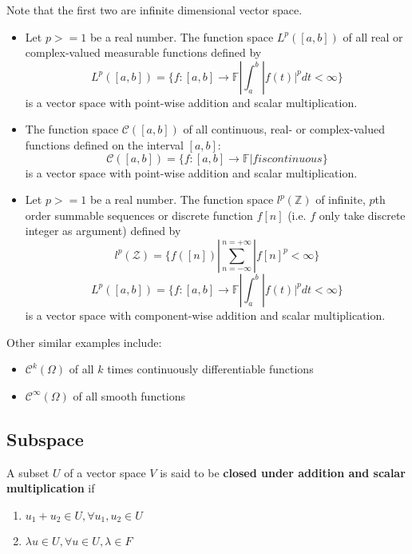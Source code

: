 \begin{refsection}
\begin{example}
\begin{itemize}
\end{itemize}	
\end{example}




\begin{example}
Note that the first two are infinite dimensional vector space.\cite{krim2015geometric}
\begin{itemize}
    \item Let $p>=1$ be a real number. The function space $L^p([a,b])$ of all real or complex-valued measurable functions defined by
    $$L^p([a,b])=\{f:[a,b]\rightarrow \mathbb{F} | \int_a^b|f(t)|^p dt < \infty\}$$
    is a vector space with point-wise addition and scalar multiplication.
    \item The function space $\mathcal{C}([a,b])$ of all continuous, real- or complex-valued functions defined on the interval $[a,b]:$
    $$\mathcal{C}([a,b])=\{f:[a,b]\rightarrow \mathbb{F}|f is continuous\}$$
    is a vector space with point-wise addition and scalar multiplication.
    
    \item Let $p>=1$ be a real number. The function space $l^p(\mathbb{Z})$ of infinite, $p$th order summable sequences or discrete function $f[n]$ (i.e. $f$ only take discrete integer as argument) defined by 
    $$l^p(\mathcal{Z})=\{f([n])|\sum_{n=-\infty}^{n=+\infty}|f[n]^p<\infty\}$$
    $$L^p([a,b])=\{f:[a,b]\rightarrow \mathbb{F} | \int_a^b|f(t)|^p dt < \infty\}$$
    is a vector space with component-wise addition and scalar multiplication.
\end{itemize}
Other similar examples include:
    \begin{itemize}
        \item $\mathcal{C}^k(\Omega)$ of all $k$ times continuously differentiable functions
        \item $\mathcal{C}^\infty(\Omega)$ of all smooth functions
    \end{itemize}
\end{example}

\subsection{Subspace}
\begin{definition}[closed]
A subset $U$ of a vector space $V$ is said to be \textbf{closed under addition and scalar multiplication} if \begin{enumerate}
\item $u_1+u_2 \in U, \forall u_1,u_2 \in U$
\item $\lambda u \in U, \forall u\in U, \lambda \in F$
\end{enumerate}
\end{definition}


\end{refsection}
